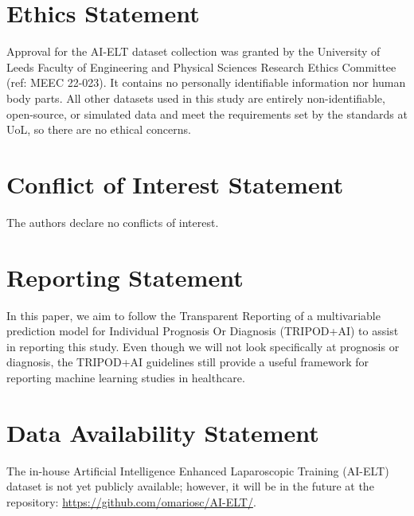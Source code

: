 \documentclass[sigconf, screen, review]{acmart}
\begin{document}
\section*{Ethics Statement}

Approval for the AI-ELT dataset collection was granted by the University of Leeds Faculty of Engineering and Physical Sciences Research Ethics Committee (ref: MEEC 22-023). It contains no personally identifiable information nor human body parts. All other datasets used in this study are entirely non-identifiable, open-source, or simulated data and meet the requirements set by the standards at UoL, so there are no ethical concerns.

\section*{Conflict of Interest Statement}

The authors declare no conflicts of interest.

\section*{Reporting Statement}

In this paper, we aim to follow the Transparent Reporting of a multivariable prediction model for Individual Prognosis Or Diagnosis (TRIPOD+AI) \cite{collins_tripodai_2024} to assist in reporting this study. Even though we will not look specifically at prognosis or diagnosis, the TRIPOD+AI guidelines still provide a useful framework for reporting machine learning studies in healthcare.

\section*{Data Availability Statement}

The in-house Artificial Intelligence Enhanced Laparoscopic Training (AI-ELT) dataset is not yet publicly available; however, it will be in the future at the repository: \url{https://github.com/omariosc/AI-ELT/}. %
\end{document}

